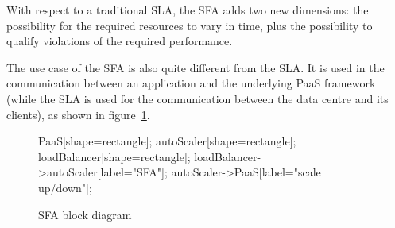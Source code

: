With respect to a traditional SLA, the SFA adds two new dimensions: the possibility for the required resources to vary in time, plus the possibility to qualify violations of the required performance.

The use case of the SFA is also quite different from the SLA. It is used in the communication between an application and the underlying PaaS framework (while the SLA is used for the communication between the data centre and its clients), as shown in figure~\ref{fig:SFABlock}.

\begin{figure}[h]
\label{fig:SFABlock}
\centering
\caption{SFA block diagram}
{
   PaaS[shape=rectangle];
   autoScaler[shape=rectangle];
   loadBalancer[shape=rectangle];
   loadBalancer->autoScaler[label="SFA"];
   autoScaler->PaaS[label="scale up/down"];
}
\end{figure}